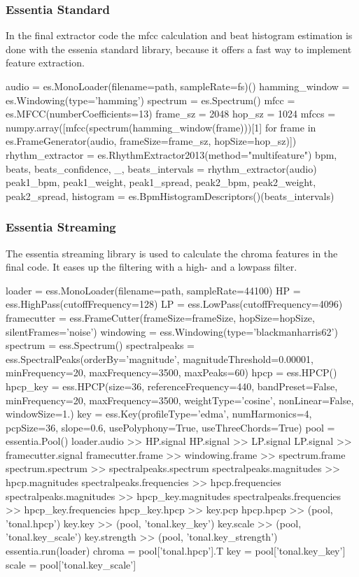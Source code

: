 \subsubsection{Essentia Standard}

In the final extractor code the mfcc calculation and beat histogram estimation is done with the essenia standard library, because it offers a fast way to implement feature extraction. 

\FloatBarrier
\begin{pythonCode}
audio = es.MonoLoader(filename=path, sampleRate=fs)()
hamming_window = es.Windowing(type='hamming')
spectrum = es.Spectrum()
mfcc = es.MFCC(numberCoefficients=13)
frame_sz = 2048
hop_sz = 1024
mfccs = numpy.array([mfcc(spectrum(hamming_window(frame)))[1] 
	for frame in es.FrameGenerator(audio, frameSize=frame_sz, hopSize=hop_sz)])
rhythm_extractor = es.RhythmExtractor2013(method="multifeature")
bpm, beats, beats_confidence, _, beats_intervals = rhythm_extractor(audio)
peak1_bpm, peak1_weight, peak1_spread, peak2_bpm, peak2_weight, peak2_spread, histogram =
	es.BpmHistogramDescriptors()(beats_intervals)
\end{pythonCode}
\FloatBarrier

\subsubsection{Essentia Streaming}

The essentia streaming library is used to calculate the chroma features in the final code. It eases up the filtering with a high- and a lowpass filter. 

\FloatBarrier
\begin{pythonCode}
loader = ess.MonoLoader(filename=path, sampleRate=44100)
HP = ess.HighPass(cutoffFrequency=128)
LP = ess.LowPass(cutoffFrequency=4096)
framecutter = ess.FrameCutter(frameSize=frameSize, hopSize=hopSize, silentFrames='noise')
windowing = ess.Windowing(type='blackmanharris62')
spectrum = ess.Spectrum()
spectralpeaks = ess.SpectralPeaks(orderBy='magnitude', magnitudeThreshold=0.00001, 
	minFrequency=20, maxFrequency=3500, maxPeaks=60)
hpcp = ess.HPCP()
hpcp_key = ess.HPCP(size=36, referenceFrequency=440, bandPreset=False, minFrequency=20,
	maxFrequency=3500, weightType='cosine', nonLinear=False, windowSize=1.)
key = ess.Key(profileType='edma', numHarmonics=4, pcpSize=36, slope=0.6, 
	usePolyphony=True, useThreeChords=True)
pool = essentia.Pool()
loader.audio >> HP.signal
HP.signal >> LP.signal
LP.signal >> framecutter.signal    
framecutter.frame >> windowing.frame >> spectrum.frame
spectrum.spectrum >> spectralpeaks.spectrum
spectralpeaks.magnitudes >> hpcp.magnitudes
spectralpeaks.frequencies >> hpcp.frequencies
spectralpeaks.magnitudes >> hpcp_key.magnitudes
spectralpeaks.frequencies >> hpcp_key.frequencies
hpcp_key.hpcp >> key.pcp
hpcp.hpcp >> (pool, 'tonal.hpcp')
key.key >> (pool, 'tonal.key_key')
key.scale >> (pool, 'tonal.key_scale')
key.strength >> (pool, 'tonal.key_strength')
essentia.run(loader)
chroma = pool['tonal.hpcp'].T
key = pool['tonal.key_key'] 
scale = pool['tonal.key_scale']
\end{pythonCode}	
\FloatBarrier

